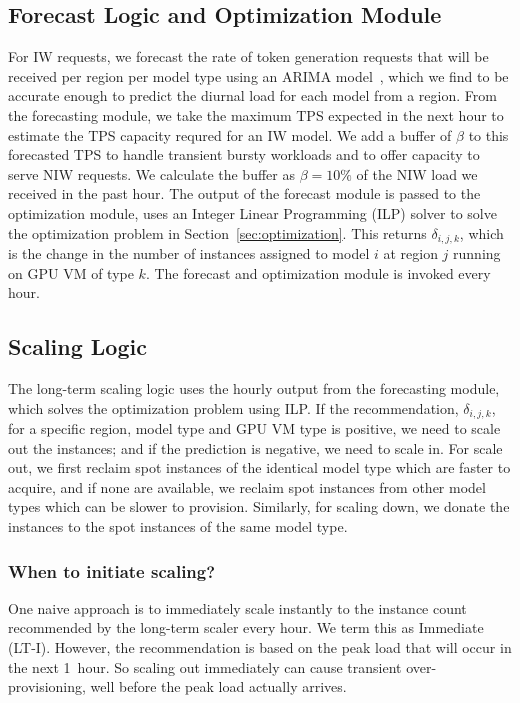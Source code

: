 \subsection{Forecast Logic and Optimization Module}\label{sec:forecast}
For IW requests, we forecast the rate of token generation requests that will be received per region per model type using an ARIMA model~\cite{shumway2017arima}, which we find to be accurate enough to predict the diurnal load for each model from a region. From the forecasting module, we take the maximum TPS expected in the next hour to estimate the TPS capacity requred for an IW model. We add a buffer of $\beta$ to this forecasted TPS to handle transient bursty workloads and to offer capacity to serve NIW requests. We calculate the buffer as $\beta=10\%$ of the NIW load we received in the past hour. The output of the forecast module is passed to the optimization module, uses an Integer Linear Programming (ILP) solver to solve the optimization problem in Section~\ref{sec:optimization}.
This returns $\delta_{i,j,k}$, which is the change in the number of instances assigned to model $i$ at region $j$ running on GPU VM of type $k$. The forecast and optimization module is invoked every hour.


\subsection{Scaling Logic} \label{sec:scaling}

The long-term scaling logic uses the hourly output from the forecasting module, which solves the optimization problem using ILP. If the recommendation, $\delta_{i,j,k}$, for a specific region, model type and GPU VM type is positive, we need to scale out the instances; and if the prediction is negative, we need to scale in. For scale out, we first reclaim spot instances of the identical model type which are faster to acquire, and if none are available, we reclaim spot instances from other model types which can be slower to provision. Similarly, for scaling down, we donate the instances to the spot instances of the same model type.

\subsubsection{When to initiate scaling?}\label{sec:lt-scaling-when}
One naive approach is to immediately scale instantly to the instance count recommended by the long-term scaler every hour. We term this as Immediate (LT-I). 
However, the recommendation is based on the peak load that will occur in the next 1~hour. So scaling out immediately can cause transient over-provisioning, well before the peak load actually arrives.

